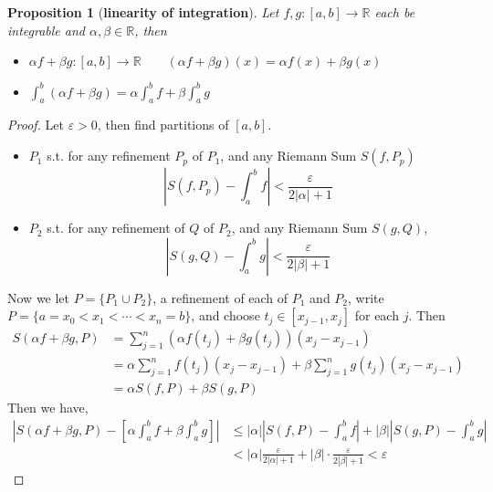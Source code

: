 \documentclass[12pt]{article}
\theoremstyle{plain}
\newtheorem{proposition}{Proposition}[subsection]
\newcommand{\abs}[1]{\left| #1 \right|}
\newcommand{\mR}{{\mathbb{R}}}
\newcommand{\ep}{\varepsilon}
\begin{document}
	\begin{proposition}[\textbf{linearity of integration}]
		Let $f,g:[a,b] \to \mR$ each be integrable and $\alpha, \beta \in \mR$,
		then 
		\begin{itemize}
			\item $\alpha f + \beta g : [a,b] \to \mR \qquad
				(\alpha f + \beta g)(x) = \alpha f(x) + \beta g(x)$
			\item $\int_a^b (\alpha f + \beta g) = \alpha \int_a^b f + \beta 
				\int_a^b g$
		\end{itemize}
	\end{proposition}
	\begin{proof}
		Let $\ep>0$, then find partitions of $[a,b]$. 
		\begin{itemize}
		\item $P_1$ s.t. for any refinement $P_p$ of $P_1$, and any Riemann Sum
			$S(f,P_p)$
			\[
				\abs{S(f,P_p) - \int_a^b f} < \frac{\ep}{2\abs{\alpha} + 1}
			\]
		\item $P_2$ s.t. for any refinement of $Q$ of $P_2$, 
			and any Riemann Sum $S(g,Q)$, 
			\[
				\abs{S(g,Q) - \int_a^b g} < \frac{\ep}{2\abs{\beta}+1}
			\]
		\end{itemize}
		Now we let $P = \{P_1\cup P_2\}$, a refinement of each of $P_1$ and 
		$P_2$, write $P=\{a=x_0<x_1<\cdots<x_n = b\}$, and choose
		$t_j \in [x_{j-1}, x_j]$ for each $j$. Then 
		\begin{align*}
			S(\alpha f +\beta g, P) 
			&= \sum_{j=1}^n (\alpha f(t_j)+\beta g(t_j)) (x_j-x_{j-1}) \\
			&=\alpha\sum_{j=1}^n f(t_j)(x_j-x_{j-1}) + 
			\beta\sum_{j=1}^n g(t_j)(x_j-x_{j-1})\\
			&= \alpha S(f,P) + \beta S(g,P)
		\end{align*}
		Then we have, 
		\begin{align*}
			\abs{S(\alpha f+\beta g, P)
				-\left[\alpha\int_a^b f+\beta\int_a^b g\right]}
			&\leq \abs{\alpha} \abs{S(f,P) - \int_a^b f} + \abs{\beta} 
			\abs{S(g,P) - \int_a^b g}\\
			&< \abs{\alpha} \frac{\ep}{2\abs{\alpha}+1} 
			+ \abs{\beta}\cdot\frac{\ep}{2\abs{\beta}+1} < \ep
		\end{align*}
	\end{proof}
\end{document}
